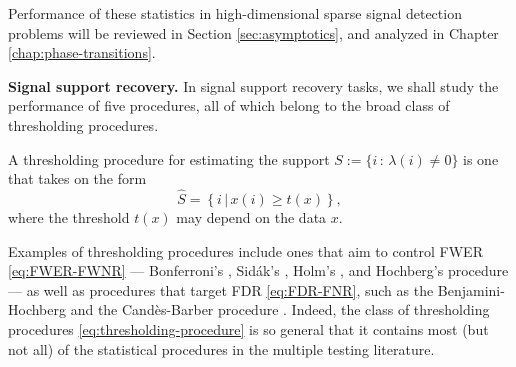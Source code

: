 Performance of these statistics in high-dimensional sparse signal detection problems will be reviewed in Section \ref{sec:asymptotics}, and analyzed in Chapter \ref{chap:phase-transitions}.

\medskip

{\bf Signal support recovery.}
In signal support recovery tasks, we shall study the performance of five procedures, all of which belong to the broad class of thresholding procedures.
\begin{definition}
A thresholding procedure for estimating the support 
$S:=\{i\, :\, \lambda(i)\neq0\}$ is one that takes on the form
\begin{equation} \label{eq:thresholding-procedure}
    \widehat{S} = \left\{i\,|\,x(i) \ge t(x)\right\},
\end{equation}
where the threshold $t(x)$ may depend on the data $x$.
\end{definition}

Examples of thresholding procedures include ones that aim to control FWER \eqref{eq:FWER-FWNR} --- Bonferroni's \cite{dunn1961multiple}, Sid\'ak's \citep{vsidak1967rectangular}, Holm's \citep{holm1979simple}, and Hochberg's procedure \citep{hochberg1988sharper} --- as well as procedures that target FDR \eqref{eq:FDR-FNR}, such as the Benjamini-Hochberg \cite{benjamini1995controlling} and the  Cand\`es-Barber procedure \cite{barber2015controlling}.
Indeed, the class of thresholding procedures \eqref{eq:thresholding-procedure} is so general that it contains most (but not all) of the statistical procedures in the multiple testing literature.



